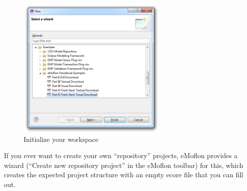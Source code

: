 \begin{figure}[htbp]
\begin{center}
  \includegraphics[width=0.65\textwidth]{eclipse_part4FreshWizardDownload}
  \caption{Initialize your workspace}
  \label{eclipse:downPartIV}
\end{center}
\end{figure}

If you ever want to create your own ``repository'' projects, eMoflon provides a wizard (``Create new repository project'' in the eMoflon toolbar) for this, which creates the expected project structure with an empty ecore file that you can fill out.

